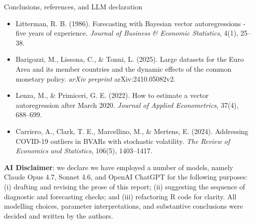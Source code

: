 \documentclass[9pt]{beamer}
\begin{document}
\begin{frame}{Conclusions, references, and LLM declaration}
\begin{itemize}
    \item Litterman, R. B. (1986). Forecasting with Bayesian vector autoregressions - five years of experience. \textit{Journal of Business \& Economic Statistics}, 4(1), 25--38.
    
    \item Barigozzi, M., Lissona, C., \& Tonni, L. (2025). Large datasets for the Euro Area and its member countries and the dynamic effects of the common monetary policy. \textit{arXiv preprint} arXiv:2410.05082v2.
    
    \item Lenza, M., \& Primiceri, G. E. (2022). How to estimate a vector autoregression after March 2020. \textit{Journal of Applied Econometrics}, 37(4), 688--699.

    \item Carriero, A., Clark, T. E., Marcellino, M., \& Mertens, E. (2024). Addressing COVID-19 outliers in BVARs with stochastic volatility. \textit{The Review of Economics and Statistics}, 106(5), 1403--1417.

\end{itemize}

\vspace{0.1cm}

\textbf{AI Disclaimer}: we declare we have employed a number of models, namely Claude Opus 4.7, Sonnet 4.6, and OpenAI ChatGPT for the following purposes: (i) drafting and revising the prose of this report; (ii) suggesting the sequence of diagnostic and forecasting checks; and (iii) refactoring R code for clarity. All modelling choices, parameter interpretations, and substantive conclusions were decided and written by the authors.

\end{frame}
\end{document}
